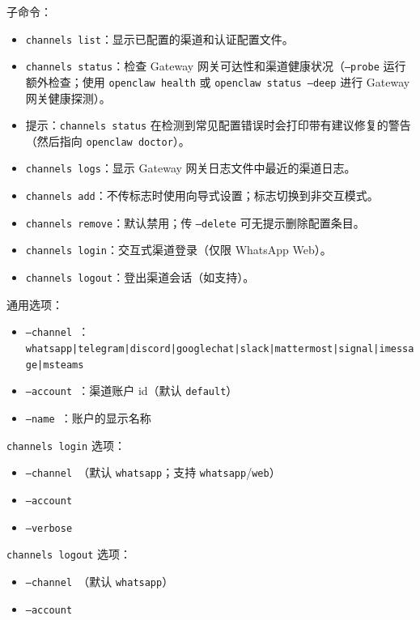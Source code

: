 子命令：

\begin{itemize}
  \item \texttt{channels list}：显示已配置的渠道和认证配置文件。
  \item \texttt{channels status}：检查 Gateway 网关可达性和渠道健康状况（\texttt{--probe} 运行额外检查；使用 \texttt{openclaw health} 或 \texttt{openclaw status --deep} 进行 Gateway 网关健康探测）。
  \item 提示：\texttt{channels status} 在检测到常见配置错误时会打印带有建议修复的警告（然后指向 \texttt{openclaw doctor}）。
  \item \texttt{channels logs}：显示 Gateway 网关日志文件中最近的渠道日志。
  \item \texttt{channels add}：不传标志时使用向导式设置；标志切换到非交互模式。
  \item \texttt{channels remove}：默认禁用；传 \texttt{--delete} 可无提示删除配置条目。
  \item \texttt{channels login}：交互式渠道登录（仅限 WhatsApp Web）。
  \item \texttt{channels logout}：登出渠道会话（如支持）。
\end{itemize}


通用选项：

\begin{itemize}
  \item \texttt{--channel }：\texttt{whatsapp|telegram|discord|googlechat|slack|mattermost|signal|imessage|msteams}
  \item \texttt{--account }：渠道账户 id（默认 \texttt{default}）
  \item \texttt{--name }：账户的显示名称
\end{itemize}


\texttt{channels login} 选项：

\begin{itemize}
  \item \texttt{--channel }（默认 \texttt{whatsapp}；支持 \texttt{whatsapp}/\texttt{web}）
  \item \texttt{--account }
  \item \texttt{--verbose}
\end{itemize}


\texttt{channels logout} 选项：

\begin{itemize}
  \item \texttt{--channel }（默认 \texttt{whatsapp}）
  \item \texttt{--account }
\end{itemize}


